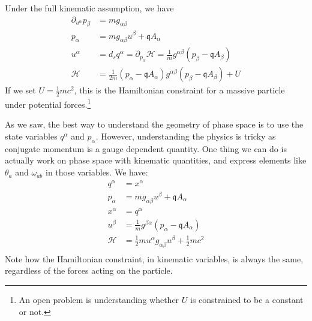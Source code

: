 Under the full kinematic assumption, we have
\begin{equation}\label{rp-cm-emHamiltonianConstraintDerivation}
	\begin{aligned}
	\partial_{u^\alpha} p_\beta &= mg_{\alpha \beta} \\
	p_{\alpha} &= mg_{\alpha \beta} u^\beta + \mathfrak{q} A_{\alpha} \\
u^{\alpha} &= d_s q^\alpha = \partial_{p_\alpha} \mathcal{H} = \frac{1}{m} g^{\alpha \beta} (p_\beta - \mathfrak{q} A_\beta) \\
\mathcal{H} &= \frac{1}{2m}\left(p_\alpha - \mathfrak{q} A_{\alpha}\right)g^{\alpha \beta} \left(p_\beta - \mathfrak{q} A_{\beta}\right) + U
	\end{aligned}
\end{equation}
If we set $U=\frac{1}{2} m c^2$, this is the Hamiltonian constraint for a massive particle under potential forces.\footnote{An open problem is understanding whether $U$ is constrained to be a constant or not.}

As we saw, the best way to understand the geometry of phase space is to use the state variables $q^\alpha$ and $p_\alpha$. However, understanding the physics is tricky as conjugate momentum is a gauge dependent quantity. One thing we can do is actually work on phase space with kinematic quantities, and express elements like $\theta_a$ and $\omega_{ab}$ in those variables. We have:
\begin{equation}
	\begin{aligned}
		q^\alpha &= x^\alpha \\
		p_\alpha &= m g_{\alpha \beta} u^\beta + \mathfrak{q} A_\alpha \\
		x^\alpha &= q^\alpha \\
		u^\beta  &= \frac{1}{m} g^{\beta \alpha} \left( p_\alpha - \mathfrak{q} A_\alpha \right) \\
		\mathcal{H} &= \frac{1}{2} m u^\alpha g_{\alpha\beta} u^\beta + \frac{1}{2}mc^2  \\
	\end{aligned}
\end{equation}
Note how the Hamiltonian constraint, in kinematic variables, is always the same, regardless of the forces acting on the particle.


